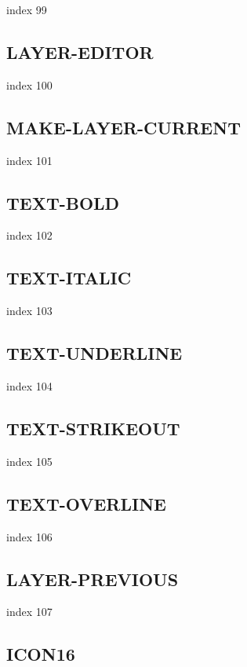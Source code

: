 \documentclass[a4paper]{report}
\begin{document}
index 99

\subsection{LAYER-EDITOR}

index 100

\subsection{MAKE-LAYER-CURRENT}

index 101

\subsection{TEXT-BOLD}

index 102

\subsection{TEXT-ITALIC}

index 103

\subsection{TEXT-UNDERLINE}

index 104

\subsection{TEXT-STRIKEOUT}

index 105

\subsection{TEXT-OVERLINE}

index 106

\subsection{LAYER-PREVIOUS}

index 107

\subsection{ICON16}
\end{document}
